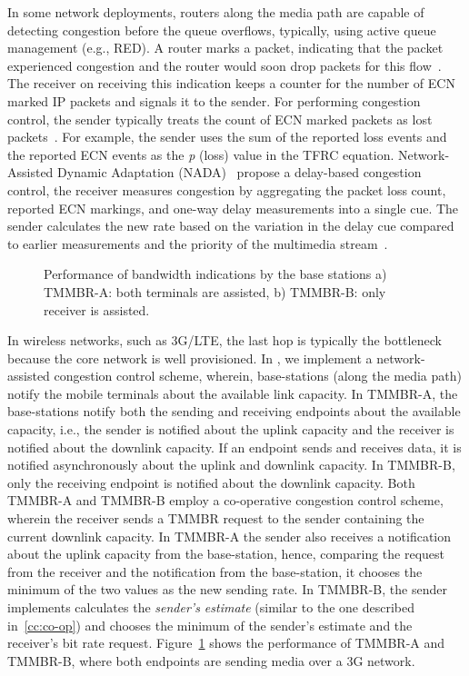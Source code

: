 In some network deployments, routers along the media path are capable of
detecting congestion before the queue overflows, typically, using active queue
management (e.g., RED). A router marks a packet, indicating that the packet
experienced congestion and the router would soon drop packets for this
flow~\cite{rfc3168}. The receiver on receiving this indication keeps a counter
for the number of ECN marked IP packets and signals it to the sender. For
performing congestion control, the sender typically treats the count of ECN
marked packets as lost packets~\cite{rfc6679}. For example, the sender uses
the sum of the reported loss events and the reported ECN events as the
\emph{p} (loss) value in the TFRC equation. Network-Assisted Dynamic
Adaptation (NADA)~\cite{rmcat-nada} propose a delay-based congestion control,
the receiver measures congestion by aggregating the packet loss count,
reported ECN markings, and one-way delay measurements into a single cue. The
sender calculates the new rate based on the variation in the delay cue
compared to earlier measurements and the priority of the multimedia
stream~\cite{pv-nada}.

\begin{figure}
  \centerline{
  }
  \caption{Performance of bandwidth indications by the base stations a)
  TMMBR-A: both terminals are assisted, b) TMMBR-B: only receiver is
  assisted.}
  \label{fig:tmmbn}
\end{figure}

In wireless networks, such as 3G/LTE, the last hop is typically the bottleneck
because the core network is well provisioned. In , we
implement a network-assisted congestion control scheme, wherein, base-stations
(along the media path) notify the mobile terminals about the available link
capacity. In TMMBR-A, the base-stations notify both the sending and receiving
endpoints about the available capacity, i.e., the sender is notified about the
uplink capacity and the receiver is notified about the downlink capacity. If
an endpoint sends and receives data, it is notified asynchronously about the
uplink and downlink capacity. In TMMBR-B, only the receiving endpoint is
notified about the downlink capacity. Both TMMBR-A and TMMBR-B employ a
co-operative congestion control scheme, wherein the receiver sends a TMMBR
request to the sender containing the current downlink capacity. In TMMBR-A the
sender also receives a notification about the uplink capacity from the
base-station, hence, comparing the request from the receiver and the
notification from the base-station, it chooses the minimum of the two values
as the new sending rate. In TMMBR-B, the sender implements calculates the
\emph{sender's estimate} (similar to the one described in~\ref{cc:co-op}) and
chooses the minimum of the sender's estimate and the receiver's bit rate
request. Figure~\ref{fig:tmmbn} shows the performance of TMMBR-A and TMMBR-B,
where both endpoints are sending media over a 3G network.

